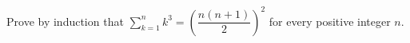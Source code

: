 Prove by induction that $\sum_{k=1}^n k^3=\left(\dfrac{n(n+1)}{2}\right)^2$ for every positive integer $n$.
